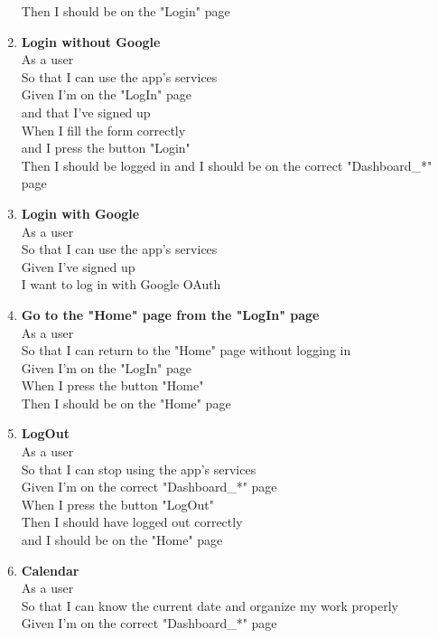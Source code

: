 \documentclass[Lau, binding=0.6cm, oneside]{sapthesis}
\begin{document}
\begin{enumerate}
			Then I should be on the "Login" page\\
	\item \textbf{Login without Google}\\
			As a user\\
			So that I can use the app’s services\\
			Given I’m on the "LogIn" page\\
			and that I’ve signed up\\
			When I fill the form correctly\\
			and I press the button "Login"\\
			Then I should be logged in and I should be on the correct "Dashboard\_*" page\\
	\item \textbf{Login with Google}\\
			As a user\\
			So that I can use the app’s services\\
			Given I’ve signed up\\
			I want to log in with Google OAuth\\
	\item \textbf{Go to the "Home" page from the "LogIn" page}\\
			As a user\\
			So that I can return to the "Home" page without logging in\\
			Given I’m on the "LogIn" page\\
			When I press the button "Home"\\
			Then I should be on the "Home" page\\
	\item \textbf{LogOut}\\
			As a user\\
			So that I can stop using the app’s services\\
			Given I’m on the correct "Dashboard\_*" page\\
			When I press the button "LogOut"\\
			Then I should have logged out correctly\\
			and I should be on the "Home" page\\
	\item \textbf{Calendar}\\
			As a user\\
			So that I can know the current date and organize my work properly\\
			Given I’m on the correct "Dashboard\_*" page\\

\end{enumerate}
\end{document}
